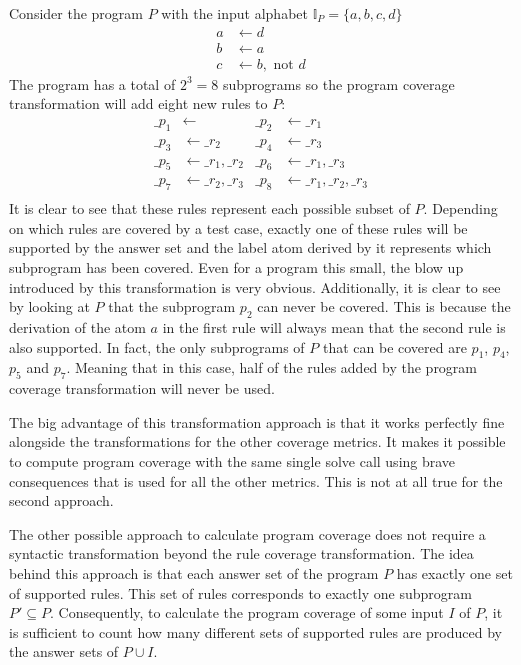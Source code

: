 \begin{example}
\label{ex:program transformation}
    Consider the program $P$ with the input alphabet \(\mathbb{I}_P = \{a, b, c, d\}\)
    \begin{align*}
        a &\leftarrow d \\
        b &\leftarrow a \\
        c &\leftarrow b, \text{ not } d
    \end{align*}
    The program has a total of \(2^3 = 8\) subprograms so the program coverage transformation will add eight new rules to $P$:
    \begin{align*}
        \_p_1 &\leftarrow              &   \_p_2 &\leftarrow \_r_1 \\
        \_p_3 &\leftarrow \_r_2        &   \_p_4 &\leftarrow \_r_3 \\
        \_p_5 &\leftarrow \_r_1, \_r_2 &   \_p_6 &\leftarrow \_r_1, \_r_3 \\
        \_p_7 &\leftarrow \_r_2, \_r_3 &   \_p_8 &\leftarrow \_r_1, \_r_2, \_r_3 \\
    \end{align*}
    It is clear to see that these rules represent each possible subset of $P$. Depending on which rules are covered by a test case, exactly one of these rules will be supported by the answer set and the label atom derived by it represents which subprogram has been covered. Even for a program this small, the blow up introduced by this transformation is very obvious. Additionally, it is clear to see by looking at $P$ that the subprogram $p_2$ can never be covered. This is because the derivation of the atom $a$ in the first rule will always mean that the second rule is also supported. In fact, the only subprograms of $P$ that can be covered are $p_1$, $p_4$, $p_5$ and $p_7$. Meaning that in this case, half of the rules added by the program coverage transformation will never be used.
\end{example}

The big advantage of this transformation approach is that it works perfectly fine alongside the transformations for the other coverage metrics. It makes it possible to compute program coverage with the same single solve call using brave consequences that is used for all the other metrics. This is not at all true for the second approach.

The other possible approach to calculate program coverage does not require a syntactic transformation beyond the rule coverage transformation. The idea behind this approach is that each answer set of the program $P$ has exactly one set of supported rules. This set of rules corresponds to exactly one subprogram \(P' \subseteq P\). Consequently, to calculate the program coverage of some input $I$ of $P$, it is sufficient to count how many different sets of supported rules are produced by the answer sets of $P \cup I$.


